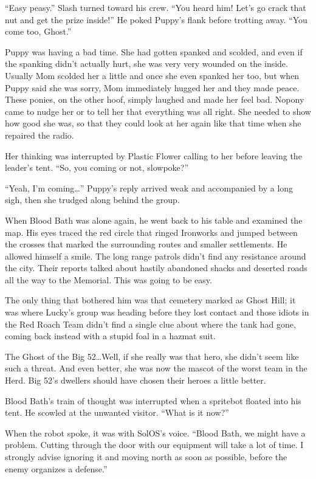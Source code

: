 ``Easy peasy.'' Slash turned toward his crew. ``You heard him! Let's go crack that nut and get the prize inside!'' He poked Puppy's flank before trotting away. ``You come too, Ghost.''

Puppy was having a bad time. She had gotten spanked and scolded, and even if the spanking didn't actually hurt, she was very very wounded on the inside. Usually Mom scolded her a little and once she even spanked her too, but when Puppy said she was sorry, Mom immediately hugged her and they made peace. These ponies, on the other hoof, simply laughed and made her feel bad. Nopony came to nudge her or to tell her that everything was all right. She needed to show how good she was, so that they could look at her again like that time when she repaired the radio.

Her thinking was interrupted by Plastic Flower calling to her before leaving the leader's tent. ``So, you coming or not, slowpoke?''

``Yeah, I'm coming\dots'' Puppy's reply arrived weak and accompanied by a long sigh, then she trudged along behind the group.

When Blood Bath was alone again, he went back to his table and examined the map. His eyes traced the red circle that ringed Ironworks and jumped between the crosses that marked the surrounding routes and smaller settlements. He allowed himself a smile. The long range patrols didn't find any resistance around the city. Their reports talked about hastily abandoned shacks and deserted roads all the way to the Memorial. This was going to be easy.

The only thing that bothered him was that cemetery marked as Ghost Hill; it was where Lucky's group was heading before they lost contact and those idiots in the Red Roach Team didn't find a single clue about where the tank had gone, coming back instead with a stupid foal in a hazmat suit.

The Ghost of the Big 52\dots Well, if she really was that hero, she didn't seem like such a threat. And even better, she was now the mascot of the worst team in the Herd. Big 52's dwellers should have chosen their heroes a little better.

Blood Bath's train of thought was interrupted when a spritebot floated into his tent. He scowled at the unwanted visitor. ``What is it now?''

When the robot spoke, it was with SolOS's voice. ``Blood Bath, we might have a problem. Cutting through the door with our equipment will take a lot of time. I strongly advise ignoring it and moving north as soon as possible, before the enemy organizes a defense.''

